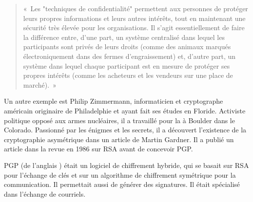 \begin{quote}
«~Les "techniques de confidentialité" permettent aux personnes de protéger leurs propres informations et leurs autres intérêts, tout en maintenant une sécurité très élevée pour les organisations. Il s'agit essentiellement de faire la différence entre, d'une part, un système centralisé dans lequel les participants sont privés de leurs droits (comme des animaux marqués électroniquement dans des fermes d'engraissement) et, d'autre part, un système dans lequel chaque participant est en mesure de protéger ses propres intérêts (comme les acheteurs et les vendeurs sur une place de marché).~»
\end{quote} %

Un autre exemple est Philip Zimmermann, informaticien et cryptographe américain originaire de Philadelphie et ayant fait ses études en Floride. Activiste politique opposé aux armes nucléaires, il a travaillé pour la  à Boulder dans le Colorado. Passionné par les énigmes et les secrets, il a découvert l'existence de la cryptographie asymétrique dans un article de Martin Gardner. Il a publié un article dans la revue  en 1986 sur RSA avant de concevoir PGP.

PGP (de l'anglais ) était un logiciel de chiffrement hybride, qui se basait sur RSA pour l'échange de clés et sur un algorithme de chiffrement symétrique pour la communication. Il permettait aussi de générer des signatures. Il était spécialisé dans l'échange de courriels.

